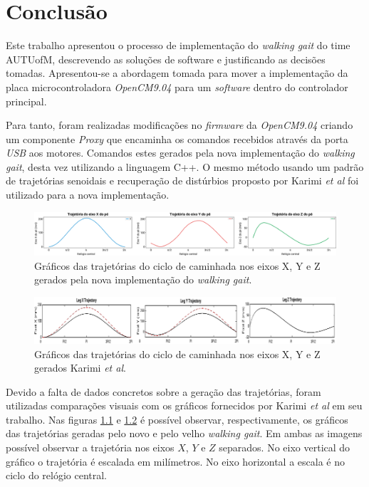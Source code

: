 \chapter{Conclusão}

Este trabalho apresentou o processo de implementação do \textit{walking gait} do time AUTUofM, descrevendo as soluções de software e justificando as decisões tomadas. Apresentou-se a abordagem tomada para mover a implementação da placa microcontroladora \textit{OpenCM9.04} para um \textit{software} dentro do controlador principal.

Para tanto, foram realizadas modificações no \textit{firmware} da \textit{OpenCM9.04} criando um componente \textit{Proxy} que encaminha os comandos recebidos através da porta \textit{USB} aos motores. Comandos estes gerados pela nova implementação do \textit{walking gait}, desta vez utilizando a linguagem C++. O mesmo método usando um padrão de trajetórias senoidais e recuperação de distúrbios proposto por Karimi \textit{et al} foi utilizado para a nova implementação.

\begin{figure}[htb]
	\centering
	\includegraphics[width=\textwidth]{imagens/svg/conclusion-trajectories-graph}
	\caption{Gráficos das trajetórias do ciclo de caminhada nos eixos X, Y e Z gerados pela nova implementação do \textit{walking gait}.}
	\label{fig:conclusion:trajectories:graph}
\end{figure}

\begin{figure}[htb]
	\centering
	\includegraphics[width=\textwidth]{imagens/conclusion-trajectories-graph-old}
	\caption{Gráficos das trajetórias do ciclo de caminhada nos eixos X, Y e Z gerados Karimi \textit{et al}.}
	\label{fig:conclusion:trajectories:graph:old}
\end{figure}

Devido a falta de dados concretos sobre a geração das trajetórias, foram utilizadas comparações visuais com os gráficos fornecidos por Karimi \textit{et al} em seu trabalho. Nas figuras \ref{fig:conclusion:trajectories:graph} e \ref{fig:conclusion:trajectories:graph:old} é possível observar, respectivamente, os gráficos das trajetórias geradas pelo novo e pelo velho \textit{walking gait}. Em ambas as imagens possível observar a trajetória nos eixos $X$, $Y$ e $Z$ separados. No eixo vertical do gráfico o trajetória é escalada em milímetros. No eixo horizontal a escala é no ciclo do relógio central.

